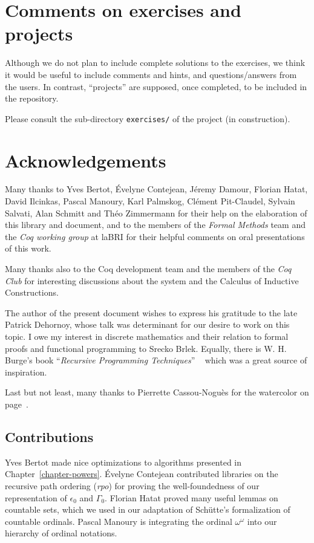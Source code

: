 \documentclass[twoside,a4paper]{book}
\begin{document}
\section{Comments on exercises and projects}

Although we do not plan to include complete solutions to the exercises, 
we think it would be useful to include comments and hints, and questions/answers from the users. In contrast, ``projects'' are supposed, once completed, to be included in the repository.

Please consult the sub-directory \texttt{exercises/} of the
 project (in construction).

\section{Acknowledgements}
\label{sec:orgheadline5}
    Many thanks to Yves Bertot, \'Evelyne Contejean, Jéremy Damour,   Florian Hatat,  David Ilcinkas, 
Pascal Manoury,  Karl Palmskog, Cl\'ement Pit-Claudel, Sylvain Salvati, Alan Schmitt and Théo Zimmermann for their help on the elaboration of this library and  document, and to the
 members of the \emph{Formal Methods} team and the \emph{Coq working group} at laBRI for their helpful comments 
on  oral presentations of this work. 

Many thanks also to the Coq development team and the members of the \emph{Coq Club} for interesting discussions about the \coq{} system and the Calculus of Inductive Constructions.

The author of the present document wishes to express his gratitude to the late Patrick Dehornoy, whose talk  was determinant for our desire to work on this topic.
I owe my interest in discrete mathematics and their relation to formal proofs and functional programming  to Srecko Brlek.  Equally, there is W. H. Burge's book ``\emph{Recursive Programming Techniques}'' ~\cite{burge} which was a great  source of inspiration.

Last but not least, many thanks to Pierrette Cassou-Noguès for the watercolor on page~\pageref{watercolor}.

\subsection{Contributions}

Yves Bertot made nice optimizations  to algorithms presented in Chapter~\ref{chapter-powers}.
\'Evelyne Contejean contributed libraries on the recursive path ordering (\emph{rpo}) for proving the well-foundedness of our representation of $\epsilon_0$ and $\Gamma_0$.
Florian Hatat proved many useful lemmas on countable sets, which we used in our adaptation of Schütte's formalization of countable ordinals. Pascal Manoury is integrating the ordinal $\omega^\omega$ into our hierarchy of ordinal notations.
\end{document}
